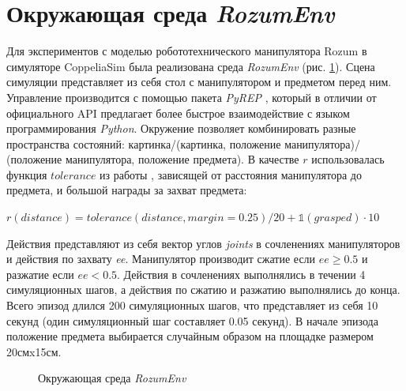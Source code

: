 \documentclass{mipt-thesis-bs}
\begin{document}
\section{Окружающая среда \textit{RozumEnv}}

Для экспериментов с моделью робототехнического манипулятора Rozum в симуляторе CoppeliaSim была реализована среда \textit{RozumEnv} (рис. \ref{rozum}). Сцена симуляции представляет из себя стол с манипулятором и предметом перед ним. Управление производится с помощью пакета \textit{PyREP} \cite{pyrep}, который в отличии от официального API предлагает более быстрое взаимодействие с языком программирования \textit{Python}. Окружение позволяет комбинировать разные пространства состояний: картинка/(картинка, положение манипулятора)/ (положение манипулятора, положение предмета). В качестве $r$ использовалась функция $tolerance$ из работы \cite{deepmind suite}, зависящей от расстояния манипулятора до предмета, и большой награды за захват предмета:
\begin{center}
$r(distance) = tolerance(distance, margin=0.25)/20 + \mathds{1}(grasped)\cdot 10$
\end{center}

Действия представляют из себя вектор углов \textit{joints} в сочленениях манипуляторов и действия по захвату \textit{ee}. Манипулятор производит сжатие если $ee\geq 0.5$ и разжатие если $ee< 0.5$. Действия в сочленениях выполнялись в течении 4 симуляционных шагов, а действия по сжатию и разжатию выполнялись до конца. Всего эпизод длился 200 симуляционных шагов, что представляет из себя 10 секунд (один симуляционный шаг составляет 0.05 секунд). В начале эпизода положение предмета выбирается случайным образом на площадке размером 20смx15см.


\begin{figure}[ht]
    \centering
    \vspace{-0.2cm}
    \caption{Окружающая среда \textit{RozumEnv}}
    \label{rozum}
\end{figure}
\end{document}
